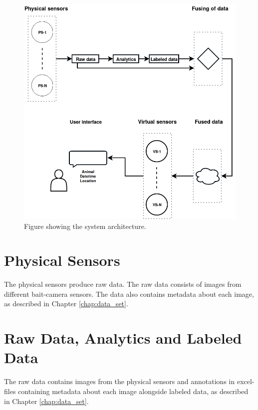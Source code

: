\documentclass[USenglish]{uit-thesis}
\begin{document}


\begin{figure}
\centering
\includegraphics[width=\textwidth]{Architecture_otto5.png}
\caption{Figure showing the system architecture.}
\label{fig:architecture1}
\end{figure}


\section{Physical Sensors}
The physical sensors produce raw data. The raw data consists of images from different bait-camera sensors.
The data also contains metadata about each image, as described in Chapter \ref{chap:data_set}. 


\section{Raw Data, Analytics and Labeled Data}
The raw data contains images from the physical sensors and annotations in excel-files containing metadata about each image alongside labeled data, as described in Chapter \ref{chap:data_set}.

\end{document}
